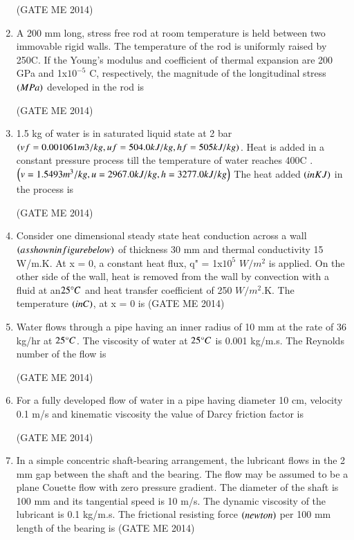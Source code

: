 \documentclass[journal]{IEEEtran}
\numberwithin{equation}{enumi}
\numberwithin{figure}{enumi}
\begin{document}
\begin{enumerate}
 \hfill{(GATE ME 2014)}
 
\item A 200 mm long, stress free rod at room temperature is held between two immovable rigid walls.
The temperature of the rod is uniformly raised by 250C. If the Young's modulus and coefficient of
thermal expansion are 200 GPa and 1x$10^{-5}$ \degree C, respectively, the magnitude of the longitudinal
stress $\left(MPa\right)$ developed in the rod is

 \hfill{(GATE ME 2014)}
 
\item 1.5 kg of water is in saturated liquid state at 2 bar $\left(vf = 0.001061 m3/kg, uf= 504.0 kJ/kg,hf= 505 kJ/kg\right)$. Heat is added in a constant pressure process till the temperature of water reaches 400\degree C .
$\left(v=1.5493 m^3/kg, u=2967.0 kJ/kg, h= 3277.0 kJ/kg\right)$
The heat added $\left(in KJ\right)$ in the process is

 \hfill{(GATE ME 2014)}

\item Consider one dimensional steady state heat conduction across a wall $\left(as shown in figure below\right)$ of
thickness 30 mm and thermal conductivity 15 W/m.K. At x = 0, a constant heat flux,
q" = 1x$10^{5}$ $W/m^{2}$ is applied. On the other side of the wall, heat is removed from the wall by
convection with a fluid at  an$25\degree C$ and heat transfer coefficient of 250 $W/m^{2}$.K. The temperature
$\left(in C\right)$, at x = 0 is
 \hfill{(GATE ME 2014)}

\item Water flows through a pipe having an inner radius of 10 mm at the rate of 36 kg/hr at $ 25 \degree C $. The viscosity of water at $25\degree C$ is 0.001 kg/m.s. The Reynolds number of the flow is

\hfill{(GATE ME 2014)}

\item For a fully developed flow of water in a pipe having diameter 10 cm, velocity 0.1 m/s and
kinematic viscosity  
 the value of Darcy friction factor is

\hfill{(GATE ME 2014)}

\item In a simple concentric shaft-bearing arrangement, the lubricant flows in the 2 mm gap between the
shaft and the bearing. The flow may be assumed to be a plane Couette flow with zero pressure
gradient. The diameter of the shaft is 100 mm and its tangential speed is 10 m/s. The dynamic
viscosity of the lubricant is 0.1 kg/m.s. The frictional resisting force $\left(newton\right)$ per 100 mm length
of the bearing is
 \hfill{(GATE ME 2014)}


\end{enumerate}
\end{document}
